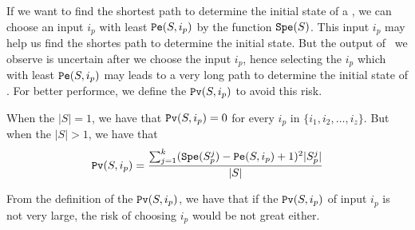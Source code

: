 If we want to find the shortest path to determine the initial state of a \BCN, we can choose an input $i_p$ with least ${\tt Pe}(S, i_p)$ by the function ${\tt Spe}(S)$. This input $i_p$ may help us find the shortes path to determine the initial state. But the output of \BCNs\ we observe is uncertain after we choose the input $i_p$, hence selecting the $i_p$ which with least ${\tt Pe}(S, i_p)$ may leads to a very long path to determine the initial state of \BCNs. For better performce, we define the $\Pv(S, i_p)$ to avoid this risk.%
\begin{definition}[$\Pv(S, i_p)$] 
When the $|S|=1$, we have that
${\tt Pv}(S, i_p)=0$  for every $i_p$ in $\{i_1,i_2,\ldots, i_z\}$. But when the $|S|>1$, 
we have that  
\[{\tt Pv}(S, i_p)=\frac{\sum_{j=1}^k ({\tt Spe}(S_p^j)-{\tt Pe}(S, i_p)+1)^2 |S_p^j|}{ |S|}\] 
\end{definition}

From the definition of the $\Pv(S, i_p)$, we have that if the $\Pv(S, i_p)$ of input $i_p$ is not very large, the risk of choosing $i_p$ would be not great either.
